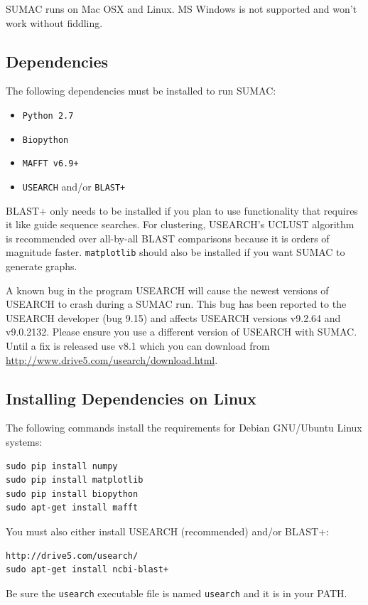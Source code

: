 \documentclass[10pt]{report}
\DeclareRobustCommand{\mybox}[2][gray!20]{
\begin{tcolorbox}[  
        breakable,
        left=0pt,
        right=0pt,
        top=0pt,
        bottom=0pt,
        colback=#1,
        colframe=#1,
        width=\dimexpr\textwidth\relax, 
        enlarge left by=0mm,
        boxsep=5pt,
        arc=0pt,outer arc=0pt,
        ]
        #2
\end{tcolorbox}
}
\begin{document}
SUMAC runs on Mac OSX and Linux. MS Windows is not supported and won't work without fiddling.

\subsection{Dependencies}

The following dependencies must be installed to run SUMAC:

\begin{itemize}
\item \texttt{Python 2.7}
\item \texttt{Biopython}
\item \texttt{MAFFT v6.9+}
\item \texttt{USEARCH} and/or \texttt{BLAST+}
\end{itemize}

BLAST+ only needs to be installed if you plan to use functionality that requires it 
like guide sequence searches.
For clustering, USEARCH's UCLUST algorithm is recommended over all-by-all BLAST
comparisons because it is orders of magnitude faster.
\texttt{matplotlib} should also be installed if you want SUMAC to generate graphs.

\vspace{1cm}

\mybox[red!20!white]{
A known bug in the program USEARCH 
will cause the newest versions of USEARCH to crash during a SUMAC run. 
This bug has been reported to the USEARCH developer (bug 9.15) 
and affects USEARCH versions v9.2.64 and v9.0.2132. Please ensure you use a different version of USEARCH with SUMAC. 
Until a fix is released use v8.1 which you can download from \url{http://www.drive5.com/usearch/download.html}.
}


\subsection{Installing Dependencies on Linux}

The following commands install the requirements for Debian GNU/Ubuntu Linux systems:

\begin{verbatim}
sudo pip install numpy
sudo pip install matplotlib
sudo pip install biopython
sudo apt-get install mafft
\end{verbatim}
You must also either install USEARCH (recommended) and/or BLAST+:
\begin{verbatim}
http://drive5.com/usearch/
sudo apt-get install ncbi-blast+
\end{verbatim}
Be sure the \texttt{usearch} executable file is named
\texttt{usearch} and it is in your PATH.
\end{document}
